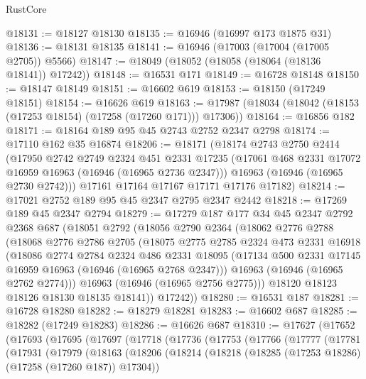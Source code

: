 \begin{lexlean}{RustCore}
\begin{coremodule}
@18131 := @18127 @18130
@18135 := @16946 (@16997 @173 @1875 @31)
@18136 := @18131 @18135
@18141 := @16946 (@17003 (@17004 (@17005 @2705)) @5566)
@18147 := @18049 (@18052 (@18058 (@18064 (@18136 @18141)) @17242))
@18148 := @16531 @171
@18149 := @16728 @18148
@18150 := @18147 @18149
@18151 := @16602 @619
@18153 := @18150 (@17249 @18151)
@18154 := @16626 @619
@18163 := @17987 (@18034 (@18042 (@18153 (@17253 @18154) (@17258 (@17260 @171))) @17306))
@18164 := @16856 @182
@18171 := @18164 @189 @95 @45 @2743 @2752 @2347 @2798
@18174 := @17110 @162 @35 @16874
@18206 := @18171
    (@18174
      @2743
      @2750
      @2414
      (@17950
        @2742
        @2749
        @2324
        @451
        @2331
        @17235
        (@17061 @468 @2331 @17072 @16959 @16963 (@16946 (@16965 @2736 @2347)))
        @16963
        (@16946 (@16965 @2730 @2742)))
      @17161
      @17164
      @17167
      @17171
      @17176
      @17182)
@18214 := @17021 @2752 @189 @95 @45 @2347 @2795 @2347 @2442
@18218 := @17269 @189 @45 @2347 @2794
@18279 := @17279
    @187
    @177
    @34
    @45
    @2347
    @2792
    @2368
    @687
    (@18051
      @2792
      (@18056
        @2790
        @2364
        (@18062
          @2776
          @2788
          (@18068
            @2776
            @2786
            @2705
            (@18075
              @2775
              @2785
              @2324
              @473
              @2331
              @16918
              (@18086
                @2774
                @2784
                @2324
                @486
                @2331
                @18095
                (@17134 @500 @2331 @17145 @16959 @16963 (@16946 (@16965 @2768 @2347)))
                @16963
                (@16946 (@16965 @2762 @2774)))
              @16963
              (@16946 (@16965 @2756 @2775)))
            @18120
            @18123
            @18126
            @18130
            @18135
            @18141))
        @17242))
@18280 := @16531 @187
@18281 := @16728 @18280
@18282 := @18279 @18281
@18283 := @16602 @687
@18285 := @18282 (@17249 @18283)
@18286 := @16626 @687
@18310 := @17627
    (@17652
      (@17693
        (@17695
          (@17697
            (@17718
              (@17736
                (@17753
                  (@17766
                    (@17777
                      (@17781
                        (@17931
                          (@17979
                            (@18163
                              (@18206
                                (@18214
                                  (@18218 (@18285 (@17253 @18286) (@17258 (@17260 @187)) @17304))

\end{coremodule}
\end{lexlean}
